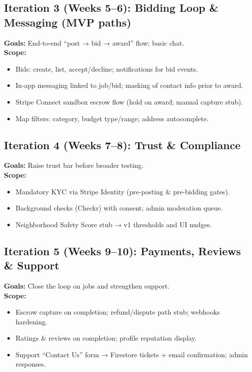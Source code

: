 \documentclass[11pt]{article}
\begin{document}
\subsection*{Iteration 3 (Weeks 5--6): Bidding Loop \& Messaging (MVP paths)}
\textbf{Goals:} End-to-end “post → bid → award” flow; basic chat. \\
\textbf{Scope:}
\begin{itemize}[leftmargin=1.4em]
  \item Bids: create, list, accept/decline; notifications for bid events.
  \item In-app messaging linked to job/bid; masking of contact info prior to award.
  \item Stripe Connect sandbox escrow flow (hold on award; manual capture stub).
  \item Map filters: category, budget type/range; address autocomplete.
\end{itemize}

\subsection*{Iteration 4 (Weeks 7--8): Trust \& Compliance}
\textbf{Goals:} Raise trust bar before broader testing. \\
\textbf{Scope:}
\begin{itemize}[leftmargin=1.4em]
  \item Mandatory KYC via Stripe Identity (pre-posting \& pre-bidding gates).
  \item Background checks (Checkr) with consent; admin moderation queue.
  \item Neighborhood Safety Score stub → v1 thresholds and UI nudges.
\end{itemize}

\subsection*{Iteration 5 (Weeks 9--10): Payments, Reviews \& Support}
\textbf{Goals:} Close the loop on jobs and strengthen support. \\
\textbf{Scope:}
\begin{itemize}[leftmargin=1.4em]
  \item Escrow capture on completion; refund/dispute path stub; webhooks hardening.
  \item Ratings \& reviews on completion; profile reputation display.
  \item Support “Contact Us” form → Firestore tickets + email confirmation; admin responses.
\end{itemize}
\end{document}
